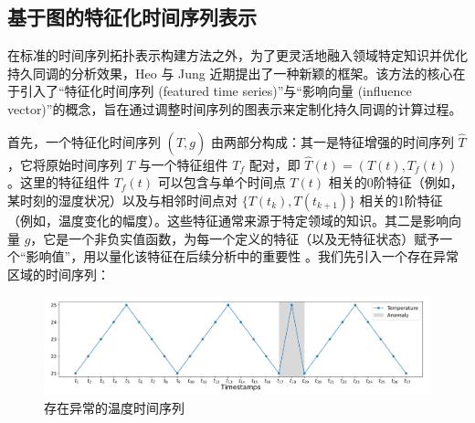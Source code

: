 \subsection{基于图的特征化时间序列表示} %
在标准的时间序列拓扑表示构建方法之外，为了更灵活地融入领域特定知识并优化持久同调的分析效果，Heo 与 Jung \cite{2} 近期提出了一种新颖的框架。该方法的核心在于引入了“特征化时间序列 (featured time series)”与“影响向量 (influence vector)”的概念，旨在通过调整时间序列的图表示来定制化持久同调的计算过程。

首先，一个特征化时间序列 $(\hat{T}, g)$ 由两部分构成：其一是特征增强的时间序列 $\hat{T}$，它将原始时间序列 $T$ 与一个特征组件 $T_f$ 配对，即 $\hat{T}(t) = (T(t), T_f(t))$。这里的特征组件 $T_f(t)$ 可以包含与单个时间点 $T(t)$ 相关的0阶特征（例如，某时刻的湿度状况）以及与相邻时间点对 $\{T(t_k), T(t_{k+1})\}$ 相关的1阶特征（例如，温度变化的幅度）。这些特征通常来源于特定领域的知识。其二是影响向量 $g$，它是一个非负实值函数，为每一个定义的特征（以及无特征状态）赋予一个“影响值”，用以量化该特征在后续分析中的重要性 。我们先引入一个存在异常区域的时间序列：
\begin{figure}[thbp!]
    \centering
    \includegraphics[width=1.0\textwidth]{figure/时间序列例子.png}
    \caption{存在异常的温度时间序列}
    \label{fig:phtsi_algorithm}
\end{figure}

